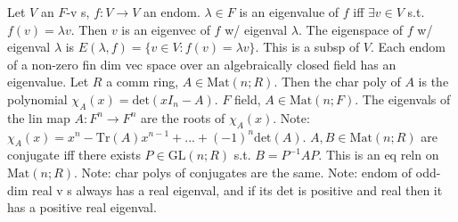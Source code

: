 Let $V$ an $F$-v s, $f: V \to V$ an endom. $\lambda \in F$ is an eigenvalue of $f$ iff
$\exists v \in V$ s.t. $f(v) = \lambda v$. Then $v$ is an eigenvec of $f$ w/ eigenval $\lambda$.
The eigenspace of $f$ w/ eigenval $\lambda$ is $E(\lambda, f) = \{v \in V : f(v) = \lambda v\}$.
This is a subsp of $V$.
Each endom of a non-zero fin dim vec space over an algebraically closed field has an eigenvalue.
Let $R$ a comm ring, $A \in \text{Mat}(n; R)$.
Then the char poly of $A$ is the polynomial $\chi_A(x) = \text{det}(xI_n - A)$.
$F$ field, $A \in \text{Mat}(n; F)$.
The eigenvals of the lin map $A : F^n \to F^n$ are the roots of $\chi_A(x)$.
Note: $\chi_A(x) = x^n - \text{Tr}(A)x^{n-1} + ... + (-1)^n \text{det}(A)$.
$A, B \in \text{Mat}(n; R)$ are conjugate iff there exists $P \in \text{GL}(n; R)$ s.t. $B = P^{-1}AP$.
This is an eq reln on $\text{Mat}(n; R)$.
Note: char polys of conjugates are the same.
Note: endom of odd-dim real v s always has a real eigenval,
and if its det is positive and real then it has a positive real eigenval.

